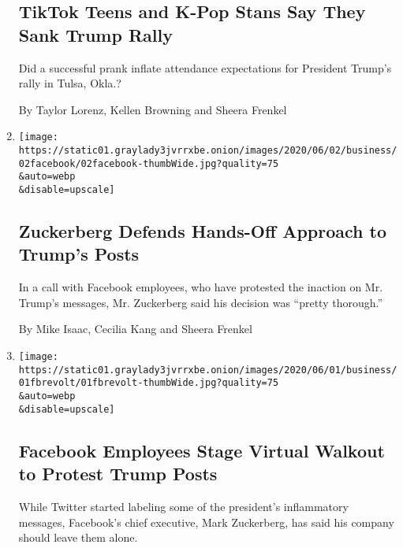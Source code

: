 \begin{enumerate}
  \hypertarget{tiktok-teens-and-k-pop-stans-say-they-sank-trump-rally}{%
  \subsection{TikTok Teens and K-Pop Stans Say They Sank Trump
  Rally}\label{tiktok-teens-and-k-pop-stans-say-they-sank-trump-rally}}

  Did a successful prank inflate attendance expectations for President
  Trump's rally in Tulsa, Okla.?

  By Taylor Lorenz, Kellen Browning and Sheera Frenkel
\item
  \href{/2020/06/02/technology/zuckerberg-defends-facebook-trump-posts.html}{}

  \texttt{[image: https://static01.graylady3jvrrxbe.onion/images/2020/06/02/business/02facebook/02facebook-thumbWide.jpg?quality=75\\\&auto=webp\\\&disable=upscale]}

  \hypertarget{zuckerberg-defends-hands-off-approach-to-trumps-posts}{%
  \subsection{Zuckerberg Defends Hands-Off Approach to Trump's
  Posts}\label{zuckerberg-defends-hands-off-approach-to-trumps-posts}}

  In a call with Facebook employees, who have protested the inaction on
  Mr. Trump's messages, Mr. Zuckerberg said his decision was ``pretty
  thorough.''

  By Mike Isaac, Cecilia Kang and Sheera Frenkel
\item
  \href{/2020/06/01/technology/facebook-employee-protest-trump.html}{}

  \texttt{[image: https://static01.graylady3jvrrxbe.onion/images/2020/06/01/business/01fbrevolt/01fbrevolt-thumbWide.jpg?quality=75\\\&auto=webp\\\&disable=upscale]}

  \hypertarget{facebook-employees-stage-virtual-walkout-to-protest-trump-posts}{%
  \subsection{Facebook Employees Stage Virtual Walkout to Protest Trump
  Posts}\label{facebook-employees-stage-virtual-walkout-to-protest-trump-posts}}

  While Twitter started labeling some of the president's inflammatory
  messages, Facebook's chief executive, Mark Zuckerberg, has said his
  company should leave them alone.


\end{enumerate}
